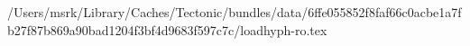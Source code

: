 /Users/msrk/Library/Caches/Tectonic/bundles/data/6ffe055852f8faf66c0acbe1a7fb27f87b869a90bad1204f3bf4d9683f597c7c/loadhyph-ro.tex